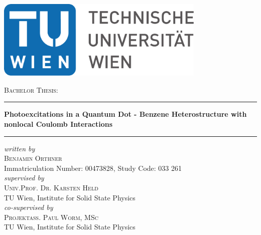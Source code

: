\documentclass[hidelinks,oneside]{scrbook}			%
\begin{document}
\begin{titlepage}
\begin{center}
    \vspace*{15mm}
    \includegraphics[width=100mm]{./graph/TU_Logo.pdf}
    
    \vspace{20mm}
    
    {\Large \textsc{Bachelor Thesis:}}
    
    \vspace{7mm}
    
    \rule{\textwidth}{0.4pt}\vspace{5mm}
    {\LARGE \textbf{Photoexcitations in a Quantum Dot - Benzene Heterostructure with nonlocal Coulomb Interactions}} \\[3mm]
    \rule{\textwidth}{0.4pt}
    
    \vspace{15mm}
    \emph{written by}\\
    {\Large \textsc{Benjamin Orthner}}\\
    Immatriculation Number: 00473828, Study Code: 033 261\\
    
    \vspace{15mm}
    \emph{supervised by}\\
    {\Large \textsc{Univ.Prof. Dr. Karsten Held}}\\
    TU Wien, Institute for Solid State Physics\\
    
    \vspace{15mm}
    \emph{co-supervised by}\\
    {\Large \textsc{Projektass. Paul Worm, MSc}}\\
    TU Wien, Institute for Solid State Physics\\
\end{center}

  \date{\today}
\vspace{\fill}
\begin{flushright} %
\makeatletter
\@date
\makeatother
\end{flushright}
\end{titlepage}
\end{document}
